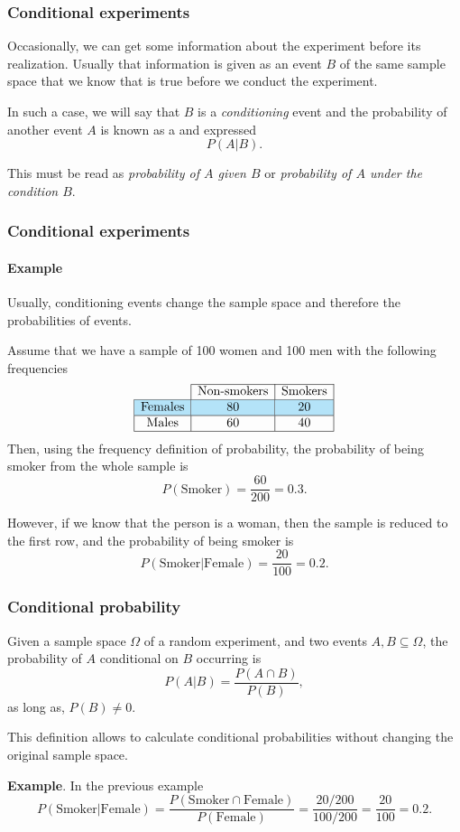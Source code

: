 \begin{frame}
\frametitle{Conditional experiments}
Occasionally, we can get some information about the experiment before its realization. 
Usually that information is given as an event $B$ of the same sample space that we know that is true before we
conduct the experiment.

In such a case, we will say that $B$ is a \emph{conditioning} event and the probability of another event $A$ is known as a  and expressed 
\[
P(A|B).
\]

This must be read as \emph{probability of $A$ given $B$} or \emph{probability of $A$ under the condition $B$}.
\end{frame}

\begin{frame}
\frametitle{Conditional experiments}
\framesubtitle{Example}
Usually, conditioning events change the sample space and therefore the probabilities of events.
 
Assume that we have a sample of 100 women and 100 men with the following frequencies
\[
\begin{array}{|c|c|c|}
\cline{2-3}
 \multicolumn{1}{c|}{} & \mbox{Non-smokers} & \mbox{Smokers} \\ \hline
 \rowcolor{color1!30} \mbox{Females} & 80 & 20 \\ \hline
 \mbox{Males} & 60 & 40 \\ \hline
\end{array}
\]
Then, using the frequency definition of probability, the probability of being smoker from the whole sample is
\[
P(\mbox{Smoker})= \frac{60}{200}=0.3.
\]

\pause

However, if we know that the person is a woman, then the sample is reduced to the first row, and the probability of
being smoker is 
\[
P(\mbox{Smoker}|\mbox{Female})=\frac{20}{100}=0.2.
\]
\end{frame}


\begin{frame}
\frametitle{Conditional probability}
\begin{definition}
Given a sample space $\Omega$ of a random experiment, and two events $A,B\subseteq \Omega$, the probability of $A$
conditional on $B$ occurring is
\[
P(A|B) = \frac{P(A\cap B)}{P(B)},
\]
as long as, $P(B)\neq 0$.
\end{definition}

This definition allows to calculate conditional probabilities without changing the original sample space. 

\textbf{Example}. In the previous example
\[
P(\mbox{Smoker}|\mbox{Female})= \frac{P(\mbox{Smoker}\cap \mbox{Female})}{P(\mbox{Female})} =
\frac{20/200}{100/200}=\frac{20}{100}=0.2.
\]
\end{frame}


